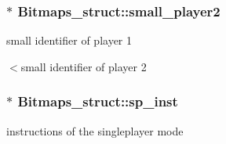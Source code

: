 \subsubsection[{\texorpdfstring{small\+\_\+player2}{small_player2}}]{$\ast$ Bitmaps\+\_\+struct\+::small\+\_\+player2}\hypertarget{group__graphics_ga6d0717c0730d1f4bf907299c4cb3fb97}{}\label{group__graphics_ga6d0717c0730d1f4bf907299c4cb3fb97}


small identifier of player 1 

$<$small identifier of player 2 
\subsubsection[{\texorpdfstring{sp\+\_\+inst}{sp_inst}}]{$\ast$ Bitmaps\+\_\+struct\+::sp\+\_\+inst}\hypertarget{group__graphics_ga067f54df47f8ccad03f63d3b683f73a5}{}\label{group__graphics_ga067f54df47f8ccad03f63d3b683f73a5}


instructions of the singleplayer mode 

